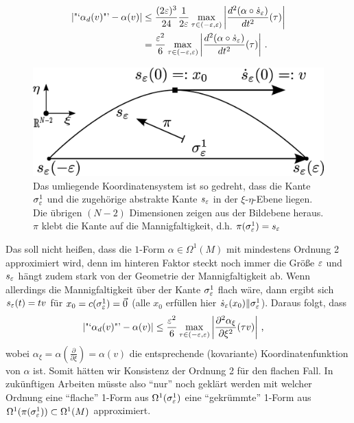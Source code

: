 \begin{bemerkung}
    \begin{align}
    \begin{aligned}
      \left| \text{"`}\alpha_{d}(v)\text{"'} - \alpha(v) \right|
              &\le \frac{(2\varepsilon)^{3}}{24} \frac{1}{2\varepsilon} \max_{\tau\in(-\varepsilon,\varepsilon)} \left|\frac{d^{2}(\alpha \circ\dot{s}_{\varepsilon})}{dt^{2}}(\tau) \right| \\
              &= \frac{\varepsilon^{2}}{6} \max_{\tau\in(-\varepsilon,\varepsilon)} \left|\frac{d^{2}(\alpha \circ \dot{s}_{\varepsilon})}{dt^{2}}(\tau) \right| \,\text{.}
    \end{aligned}
    \end{align}
    \begin{figure}
      \includegraphics[width=\textwidth]{bilder/EpsilonKette.eps}
      \caption[Approximation einer 1-Form]{Das umliegende Koordinatensystem ist so gedreht, dass die Kante \( \sigma_{\varepsilon}^{1} \) und die zugehörige abstrakte Kante \( s_{\varepsilon} \)
                                           in der \( \xi \)-\( \eta \)-Ebene liegen. Die übrigen \( (N-2) \) Dimensionen zeigen aus der Bildebene heraus.
                                           \( \pi \) klebt die Kante auf die Mannigfaltigkeit, d.h. \( \pi(\sigma_{\varepsilon}^{1}) = s_{\varepsilon} \)}
      \label{figDiskrete1Form}
    \end{figure}
    Das soll nicht heißen, dass die \( 1 \)-Form \( \alpha\in\Omega^{1}(M) \) mit mindestens Ordnung 2 approximiert wird, denn im hinteren Faktor steckt noch immer die Größe \( \varepsilon \)
    und \( s_{\varepsilon} \) hängt zudem stark von der Geometrie der Mannigfaltigkeit ab.
    Wenn allerdings die Mannigfaltigkeit über der Kante \( \sigma^{1}_{\varepsilon} \) flach wäre, dann ergibt sich \( s_{\varepsilon}(t)=t v  \) für
    \( x_{0} = c(\sigma^{1}_{\varepsilon}) = \vec{0} \) (alle \( x_{0} \) erfüllen hier \( \dot{s}_{\varepsilon}(x_{0}) \| \sigma_{\varepsilon}^{1} \)).
    Daraus folgt, dass
    \begin{align}
      \left| \text{"`}\alpha_{d}(v)\text{"'} - \alpha(v) \right| 
            &\le \frac{\varepsilon^{2}}{6} \max_{\tau\in(-\varepsilon,\varepsilon)} \left|\frac{\partial^{2}\alpha_{\xi}}{\partial\xi^{2}}(\tau v) \right| \,\text{,}
    \end{align}
    wobei \( \alpha_{\xi} = \alpha(\frac{\partial}{\partial\xi})=\alpha(v) \) die entsprechende (kovariante) Koordinatenfunktion von \( \alpha \) ist.
    Somit hätten wir Konsistenz der Ordnung 2 für den flachen Fall.
    In zukünftigen Arbeiten müsste also "`nur"' noch geklärt werden mit welcher Ordnung eine "`flache"' 1-Form aus \( \Omega^{1}(\sigma^{1}_{\varepsilon}) \) eine
    "`gekrümmte"' 1-Form aus \( \Omega^{1}(\pi(\sigma^{1}_{\varepsilon}))\subset\Omega^{1}(M) \) approximiert.
    

\end{bemerkung}
